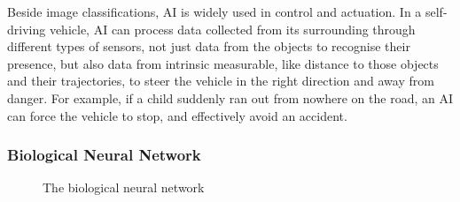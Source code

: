Beside image classifications, AI is widely used in control and actuation. In a self-driving vehicle, AI can process data collected from its surrounding through different types of sensors, not just data from the objects to recognise their presence, but also data from intrinsic measurable, like distance to those objects and their trajectories, to steer the vehicle in the right direction and away from danger. For example, if a child suddenly ran out from nowhere on the road, an AI can force the vehicle to stop, and effectively avoid an accident.
\subsubsection{Biological Neural Network}
\begin{figure}[H]
	\centering
	\caption{The biological neural network}
	\label{fig:bionetwork}
\end{figure}
